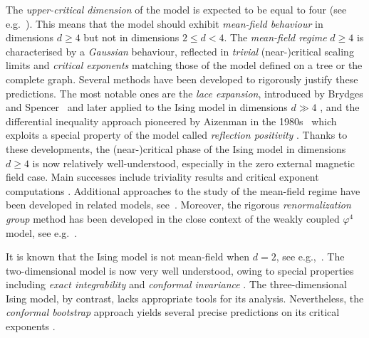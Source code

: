 \documentclass[11pt,a4paper]{article}
\numberwithin{equation}{section}
\theoremstyle{plain}
\theoremstyle{definition}
\begin{document}
The \emph{upper-critical dimension} of the model is expected to be equal to four (see e.g.~\cite{WilsonFisher1972dcexpansion}). This means that the model should exhibit \emph{mean-field behaviour} in dimensions $d\geq 4$ but not in dimensions $2\leq d<4$.
The \emph{mean-field regime} $d\geq 4$ is characterised by a \emph{Gaussian} 
behaviour, reflected in \emph{trivial} (near-)critical scaling limits 
and \emph{critical exponents} matching those of the model defined on a 
tree or the complete graph. Several methods have been developed to rigorously justify these 
predictions. The most notable ones are the \emph{lace expansion}, 
introduced by Brydges and Spencer~\cite{BrydgesSpencerSAW} and later 
applied to the Ising model in dimensions $d\gg 4$ 
\cite{Sakai2007LaceExpIsing,Sakai2022correctboundsIsing}, and the 
differential inequality approach pioneered by Aizenman in the 
1980s~\cite{AizenmanGeometricAnalysis1982} which exploits a special 
property of the model called \emph{reflection positivity} \cite{FrohlichSimonSpencerIRBounds1976,FrohlichIsraelLiebSimon1978}.  Thanks to these developments, the (near-)critical phase of the Ising model in dimensions $d\geq 4$ is now relatively well-understood, especially in the zero external magnetic field case. Main successes include triviality results \cite{AizenmanGeometricAnalysis1982,FrohlichTriviality1982,AizenmanDuminilTriviality2021,PanisTriviality2023} and critical exponent computations \cite{AizenmanFernandezCriticalBehaviorMagnetization1986,AizenmanBarskyFernandezSharpnessIsing1987,AizenmanGeometricAnalysis1982,FrohlichTriviality1982,DuminilPanis2024newLB,vEGPS,AizenmanGrahamRenormalizedCouplingSusceptibility4d1983,Sakai2007LaceExpIsing}.
Additional approaches to the study of the mean-field regime have been developed in related models, 
see~\cite{DumPan24WSAW,DumPan24Perco,duminil2026random,hutchcroft2025criticalI,hutchcroft2025criticalIII}. Moreover, the rigorous \emph{renormalization group} method has been developed in the close context of the weakly coupled $\varphi^4$ model, see e.g.~\cite{gawedzki1985massless,BBS19,SladeTombergRGWeakPhi4in2016,BauerschmidtBrydgesSlade2014Phi4fourdim,lohmann2020critical,park2025renormalisation,bauerschmidt2017finite}.


It is known that the Ising model is not mean-field when $d=2$, 
see e.g.,~\cite{AizenmanGeometricAnalysis1982,camia2016planar}. The
two-dimensional model is now very well understood, owing to special properties 
including \emph{exact integrability} 
\cite{Onsager1944,Yang1952spontaneous,McCoyWu1973two} and 
\emph{conformal invariance} 
\cite{SmirnovConformalInvarianceIsing,ChelkakHonglerIz2015conformal,ChelkakDCHonglerKempSmir2014CV}. 
The three-dimensional Ising model, by contrast, lacks appropriate tools for its analysis. Nevertheless, the \emph{conformal bootstrap} approach yields 
several precise predictions on its critical exponents 
\cite{RychkovNonGaussianity2017,ElShowkRychkov2012ConfBootstrapI,ElShowkRychkov2014ConfBootstrapII}.
\end{document}
